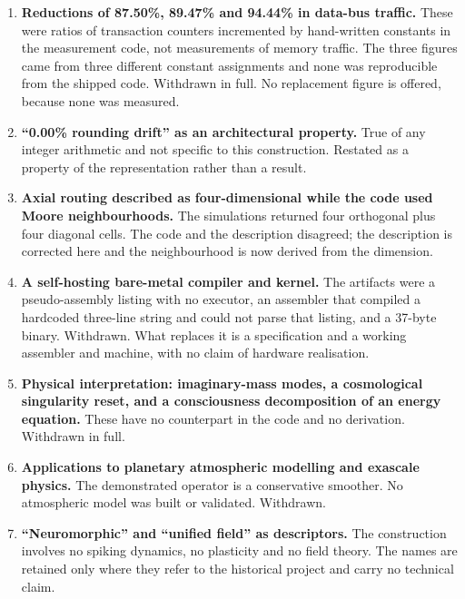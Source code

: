 \documentclass[11pt,a4paper]{article}
\theoremstyle{definition}
\begin{document}
\begin{enumerate}[leftmargin=1.4em]
\item \textbf{Reductions of 87.50\%, 89.47\% and 94.44\% in data-bus traffic.}
These were ratios of transaction counters incremented by hand-written
constants in the measurement code, not measurements of memory traffic. The
three figures came from three different constant assignments and none was
reproducible from the shipped code. Withdrawn in full. No replacement figure is
offered, because none was measured.

\item \textbf{``0.00\% rounding drift'' as an architectural property.} True of
any integer arithmetic and not specific to this construction. Restated as a
property of the representation rather than a result.

\item \textbf{Axial routing described as four-dimensional while the code used
Moore neighbourhoods.} The simulations returned four
orthogonal plus four diagonal cells. The code and the description disagreed;
the description is corrected here and the neighbourhood is now derived from the
dimension.

\item \textbf{A self-hosting bare-metal compiler and kernel.} The artifacts were
a pseudo-assembly listing with no executor, an assembler that compiled a
hardcoded three-line string and could not parse that listing, and a 37-byte
binary. Withdrawn. What replaces it is a specification and a working assembler
and machine, with no claim of hardware realisation.

\item \textbf{Physical interpretation: imaginary-mass modes, a cosmological
singularity reset, and a consciousness decomposition of an energy equation.}
These have no counterpart in the code and no derivation. Withdrawn in full.

\item \textbf{Applications to planetary atmospheric modelling and exascale
physics.} The demonstrated operator is a conservative smoother. No atmospheric
model was built or validated. Withdrawn.

\item \textbf{``Neuromorphic'' and ``unified field'' as descriptors.} The
construction involves no spiking dynamics, no plasticity and no field theory.
The names are retained only where they refer to the historical project and
carry no technical claim.
\end{enumerate}
\end{document}
